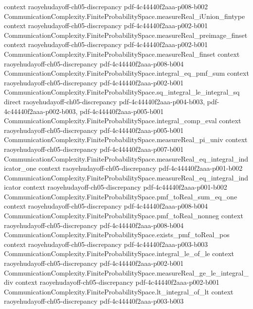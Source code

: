 \begin{lemma}
  {context}
  {raoyehudayoff-ch05-discrepancy}
  {pdf-4c44440f2aaa-p008-b002}
\proofstep
  {CommunicationComplexity.FiniteProbabilitySpace.measureReal_iUnion_fintype}
  {context}
  {raoyehudayoff-ch05-discrepancy}
  {pdf-4c44440f2aaa-p002-b001}
\proofstep
  {CommunicationComplexity.FiniteProbabilitySpace.measureReal_preimage_finset}
  {context}
  {raoyehudayoff-ch05-discrepancy}
  {pdf-4c44440f2aaa-p002-b001}
\proofstep
  {CommunicationComplexity.FiniteProbabilitySpace.measureReal_finset}
  {context}
  {raoyehudayoff-ch05-discrepancy}
  {pdf-4c44440f2aaa-p008-b004}
\proofstep
  {CommunicationComplexity.FiniteProbabilitySpace.integral_eq_pmf_sum}
  {context}
  {raoyehudayoff-ch05-discrepancy}
  {pdf-4c44440f2aaa-p002-b001}
\proofstep
  {CommunicationComplexity.FiniteProbabilitySpace.sq_integral_le_integral_sq}
  {direct}
  {raoyehudayoff-ch05-discrepancy}
  {pdf-4c44440f2aaa-p004-b003,
    pdf-4c44440f2aaa-p002-b003,
    pdf-4c44440f2aaa-p005-b001}
\proofstep
  {CommunicationComplexity.FiniteProbabilitySpace.integral_comp_eval}
  {context}
  {raoyehudayoff-ch05-discrepancy}
  {pdf-4c44440f2aaa-p005-b001}
\proofstep
  {CommunicationComplexity.FiniteProbabilitySpace.measureReal_pi_univ}
  {context}
  {raoyehudayoff-ch05-discrepancy}
  {pdf-4c44440f2aaa-p007-b001}
\proofstep
  {CommunicationComplexity.FiniteProbabilitySpace.measureReal_eq_integral_indicator_one}
  {context}
  {raoyehudayoff-ch05-discrepancy}
  {pdf-4c44440f2aaa-p001-b002}
\proofstep
  {CommunicationComplexity.FiniteProbabilitySpace.measureReal_eq_integral_indicator}
  {context}
  {raoyehudayoff-ch05-discrepancy}
  {pdf-4c44440f2aaa-p001-b002}
\proofstep
  {CommunicationComplexity.FiniteProbabilitySpace.pmf_toReal_sum_eq_one}
  {context}
  {raoyehudayoff-ch05-discrepancy}
  {pdf-4c44440f2aaa-p008-b004}
\proofstep
  {CommunicationComplexity.FiniteProbabilitySpace.pmf_toReal_nonneg}
  {context}
  {raoyehudayoff-ch05-discrepancy}
  {pdf-4c44440f2aaa-p008-b004}
\proofstep
  {CommunicationComplexity.FiniteProbabilitySpace.exists_pmf_toReal_pos}
  {context}
  {raoyehudayoff-ch05-discrepancy}
  {pdf-4c44440f2aaa-p003-b003}
\proofstep
  {CommunicationComplexity.FiniteProbabilitySpace.integral_le_of_le}
  {context}
  {raoyehudayoff-ch05-discrepancy}
  {pdf-4c44440f2aaa-p002-b001}
\proofstep
  {CommunicationComplexity.FiniteProbabilitySpace.measureReal_ge_le_integral_div}
  {context}
  {raoyehudayoff-ch05-discrepancy}
  {pdf-4c44440f2aaa-p002-b001}
\proofstep
  {CommunicationComplexity.FiniteProbabilitySpace.lt_integral_of_lt}
  {context}
  {raoyehudayoff-ch05-discrepancy}
  {pdf-4c44440f2aaa-p003-b003}

\end{lemma}
